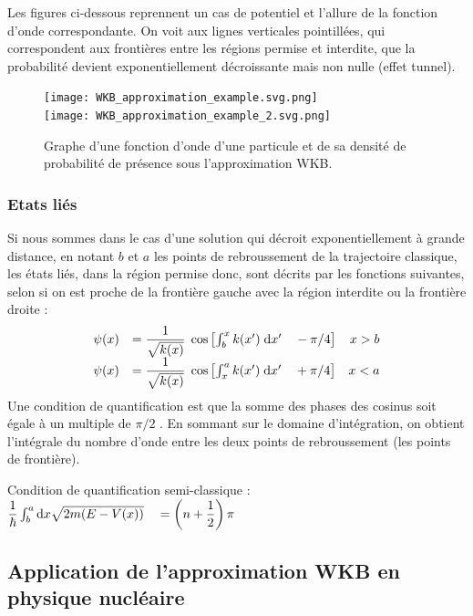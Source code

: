 \documentclass[12pt, a4paper]{book}
\begin{document}
Les figures ci-dessous reprennent un cas de potentiel et l'allure de la fonction d'onde correspondante. On voit aux lignes verticales pointillées, qui correspondent aux frontières entre les régions permise et interdite, que la probabilité devient exponentiellement décroissante mais non nulle (effet tunnel).
\begin{figure}[h]
  \centering
  \texttt{[image: WKB\_approximation\_example.svg.png]} \\ \texttt{[image: WKB\_approximation\_example\_2.svg.png]}
  \caption{Graphe d'une fonction d'onde d'une particule et de sa densité de probabilité de présence sous l'approximation WKB.}
\end{figure}

\subsubsection{Etats liés}
Si nous sommes dans le cas d'une solution qui décroit exponentiellement à grande distance, en notant $b$ et $a$ les points de rebroussement de la trajectoire classique, les états liés, dans la région permise donc, sont décrits par les fonctions suivantes, selon si on est proche de la frontière gauche avec la région interdite ou la frontière droite :
\begin{equation}
  \begin{array}{llr}
    \psi(x) &= \dfrac{1}{\sqrt{k(x)}} \; \cos\left[\int_b ^x k(x')\; \mathrm{d} x' \quad - \pi/4\right] & x>b \\   
    \psi(x) &= \dfrac{1}{\sqrt{k(x)}} \; \cos\left[\int_x ^a k(x')\; \mathrm{d} x' \quad + \pi/4\right] & x<a    
  \end{array}
\end{equation}
Une condition de quantification est que la somme des phases des cosinus soit égale à un multiple de $\pi/2$ . En sommant sur le domaine d'intégration, on obtient l'intégrale du nombre d'onde entre les deux points de rebroussement (les points de frontière).
\begin{center}
  Condition de quantification semi-classique : $\dfrac{1}{\hbar} \int_b ^a \mathrm{d}x \sqrt{2m(E-V(x))} \quad = \left(n+\dfrac{1}{2}\right) \pi$
\end{center}
\subsection{Application de l'approximation WKB en physique nucléaire}
\end{document}
